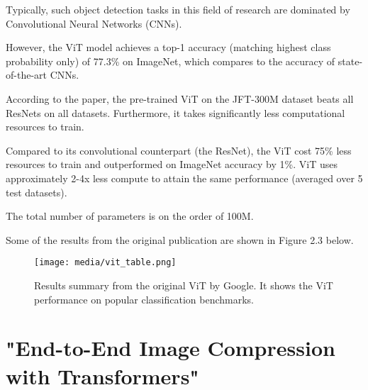Typically, such object detection tasks in this field of research are dominated by Convolutional Neural Networks (CNNs).

However, the ViT model achieves a top-1 accuracy (matching highest class probability only) of 77.3\% on ImageNet, which 
compares to the accuracy of state-of-the-art CNNs.


According to the paper, the pre-trained ViT on the JFT-300M dataset beats all ResNets on all
datasets. Furthermore, it takes significantly less computational resources to train. \citep{dosovitskiy2020vit}

Compared to its convolutional counterpart (the ResNet), the ViT cost 75\% 
less resources to train and outperformed on ImageNet accuracy by 1\%. 
ViT uses approximately 2-4x less compute to attain the same performance 
(averaged over 5 test datasets). 

The total number of parameters is on the order of 100M.

Some of the results from the original publication are shown in Figure 2.3 below.

\begin{figure}[H]
	\begin{center}
	\texttt{[image: media/vit\_table.png]}
	\end{center}
	\caption[Original ViT Results]{Results summary from the original ViT by Google. It shows 
    the ViT performance on popular classification benchmarks. \citep{dosovitskiy2020vit}}
	\end{figure}







\newpage
\section{"End-to-End Image Compression with Transformers"}


